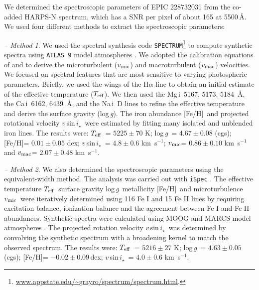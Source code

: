 \documentclass[twocolumn]{aastex61}
\newcommand\vsini{$v$\,sin\,$i_\star$}
\newcommand\vmic{$v_{\rm mic}$}
\newcommand\vmac{$v_{\rm mac}$}
\newcommand\teff{$T_{\rm eff}$}
\newcommand\logg{log\,{\it g}}
\newcommand\met{[Fe/H]}
\begin{document}
\label{sec:stellar}

We determined the spectroscopic parameters of EPIC 228732031 from the co-added HARPS-N spectrum, which has a SNR per pixel of about 165 at 5500\,\AA. We used four different methods to extract the spectroscopic parameters:

\emph{-- Method 1}. We used the spectral synthesis code \texttt{SPECTRUM}\footnote{\url{www.appstate.edu/~grayro/spectrum/spectrum.html}.} \citep[V2.76;][]{Gray1994} to compute synthetic spectra using \texttt{ATLAS\,9} model atmospheres \citep{Castelli2004}. We adopted the calibration equations of \citet{Bruntt2010} and \citet{Doyle2014} to derive the microturbulent (\vmic) and macroturbulent (\vmac) velocities. We focused on spectral features that are most sensitive to varying photospheric parameters. Briefly, we used the wings of the H$\alpha$ line to obtain an initial estimate of the effective temperature (\teff). We then used the Mg\,{\sc i}~5167, 5173, 5184~\AA, the Ca\,{\sc i}~6162, 6439~\AA, and the Na\,{\sc i}~D lines to refine the effective temperature and derive the surface gravity (\logg). The iron abundance \met\ and projected rotational velocity \vsini\ were estimated by fitting many isolated and unblended iron lines. The results were: \teff\ = $5225 \pm 70$ K; \logg\ =  $4.67 \pm 0.08$ (cgs); \met =  $0.01\pm 0.05$ dex; \vsini\ =  $4.8 \pm 0.6$ km~s$^{-1}$; \vmic =  $0.86 \pm 0.10$ km~s$^{-1}$ and \vmac =  $2.07 \pm 0.48$ km~s$^{-1}$.

\emph{-- Method 2}. We also determined the spectroscopic parameters using the equivalent-width method. The analysis was carried out with {\tt iSpec} \citep{Blanco-Cuaresma2014}. The effective temperature \teff\, surface gravity \logg\, metallicity \met\ and microturbulence \vmic\ were iteratively determined using 116 Fe I and 15 Fe II lines by requiring excitation balance, ionization balance and the agreement between Fe I and Fe II abundances. Synthetic spectra were calculated using MOOG \citep{Sneden1973} and MARCS model atmospheres \citep{Gustafsson2008}. The projected rotation velocity \vsini\ was determined by convolving the synthetic spectrum with a broadening kernel to match the observed spectrum. The results were: \teff\ = $5216 \pm 27$ K; \logg\ =  $4.63 \pm 0.05$ (cgs); \met =  $-0.02\pm 0.09$\,dex; \vsini\ =  $4.0 \pm 0.6$ km~s$^{-1}$.
\end{document}
